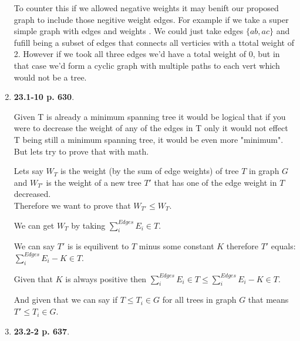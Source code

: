 \documentclass{article}
\begin{document}
\begin{enumerate}
    To counter this if we allowed negative weights it may benift our proposed graph to include those negitive weight edges. For example if we take a super simple graph with edges  and weights .
    We could just take edges $\{ab, ac\}$ and fufill being a subset of edges that connects all verticies with a ttotal weight of 2. However if we took all three edges we'd have a total weight of 0, but in that case we'd form a cyclic graph with multiple paths to each vert which would not be a tree.

    \item \textbf{23.1-10 p. 630}.
    
    Given T is already a minimum spanning tree it would be logical that if you were to decrease the weight of any of the edges in T only it would not effect T being still a minimum spanning tree, it would be even more "minimum". 
    But lets try to prove that with math. 

    Lets say $W_T$ is the weight (by the sum of edge weights) of tree $T$ in graph $G$ and $W_{T'}$ is the weight of a new tree $T'$ that has one of the edge weight in $T$ decreased.\\

    Therefore we want to prove that $W_{T'} \leq W_T$. 

    We can get $W_T$ by taking $\sum_{i}^{Edges} E_i \in T$.

    We can say $T'$ is is equilivent to $T$ minus some constant $K$ therefore $T'$ equals: $\sum_{i}^{Edges} E_i - K \in T$.

    Given that $K$ is always positive then $\sum_{i}^{Edges} E_i \in T \leq \sum_{i}^{Edges} E_i - K \in T$.

    And given that we can say if $T \leq T_i \in G$ for all trees in graph $G$ that means $T' \leq T_i \in G$.

    \item \textbf{23.2-2 p. 637}.
    


  \end{enumerate} %
\end{document}
